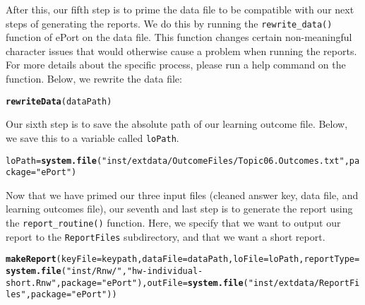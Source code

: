 \documentclass{article}\usepackage[]{graphicx}\usepackage[]{color}
\makeatletter
\newcommand{\hlstr}[1]{\textcolor[rgb]{0.192,0.494,0.8}{#1}}%
\newcommand{\hlstd}[1]{\textcolor[rgb]{0.345,0.345,0.345}{#1}}%
\newcommand{\hlkwb}[1]{\textcolor[rgb]{0.69,0.353,0.396}{#1}}%
\newcommand{\hlkwc}[1]{\textcolor[rgb]{0.333,0.667,0.333}{#1}}%
\newcommand{\hlkwd}[1]{\textcolor[rgb]{0.737,0.353,0.396}{\textbf{#1}}}%
\newenvironment{kframe}{%
 \def\at@end@of@kframe{}%
 \ifinner\ifhmode%
  \def\at@end@of@kframe{\end{minipage}}%
  \begin{minipage}{\columnwidth}%
 \fi\fi%
 \def\FrameCommand##1{\hskip\@totalleftmargin \hskip-\fboxsep
 \colorbox{shadecolor}{##1}\hskip-\fboxsep
     \hskip-\linewidth \hskip-\@totalleftmargin \hskip\columnwidth}%
 \MakeFramed {\advance\hsize-\width
   \@totalleftmargin\z@ \linewidth\hsize
   \@setminipage}}%
 {\par\unskip\endMakeFramed%
 \at@end@of@kframe}
\newenvironment{knitrout}{}{} %
\numberwithin{equation}{section} %
\makeatother
\begin{document}
After this, our fifth step is to prime the data file to be compatible with our next steps of generating the reports. We do this by running the \texttt{rewrite\_data()} function of ePort on the data file. This function changes certain non-meaningful character issues that would otherwise cause a problem when running the reports. For more details about the specific process, please run a help command on the function. Below, we rewrite the data file:

\begin{knitrout}
\color{fgcolor}\begin{kframe}
\begin{alltt}
\hlkwd{rewriteData}\hlstd{(dataPath)}
\end{alltt}
\end{kframe}
\end{knitrout}

Our sixth step is to save the absolute path of our learning outcome file. Below, we save this to a variable called \texttt{loPath}.

\begin{knitrout}
\color{fgcolor}\begin{kframe}
\begin{alltt}
\hlstd{loPath} \hlkwb{=} \hlkwd{system.file}\hlstd{(}\hlstr{"inst/extdata/OutcomeFiles/Topic06.Outcomes.txt"}\hlstd{,} \hlkwc{package}\hlstd{=}\hlstr{"ePort"}\hlstd{)}
\end{alltt}
\end{kframe}
\end{knitrout}

Now that we have primed our three input files (cleaned answer key, data file, and learning outcomes file), our seventh and last step is to generate the report using the \texttt{report\_routine()} function. Here, we specify that we want to output our report to the \texttt{ReportFiles} subdirectory, and that we want a short report.

\begin{knitrout}
\color{fgcolor}\begin{kframe}
\begin{alltt}
\hlkwd{makeReport}\hlstd{(}\hlkwc{keyFile}\hlstd{=keypath,}\hlkwc{dataFile}\hlstd{=dataPath,}\hlkwc{loFile}\hlstd{=loPath,}\hlkwc{reportType}\hlstd{=}\hlkwd{system.file}\hlstd{(}\hlstr{"inst/Rnw/"}\hlstd{,} \hlstr{"hw-individual-short.Rnw"}\hlstd{,} \hlkwc{package}\hlstd{=}\hlstr{"ePort"}\hlstd{),}\hlkwc{outFile}\hlstd{=}\hlkwd{system.file}\hlstd{(}\hlstr{"inst/extdata/ReportFiles"}\hlstd{,} \hlkwc{package}\hlstd{=}\hlstr{"ePort"}\hlstd{))}
\end{alltt}
\end{kframe}
\end{knitrout}
\end{document}
